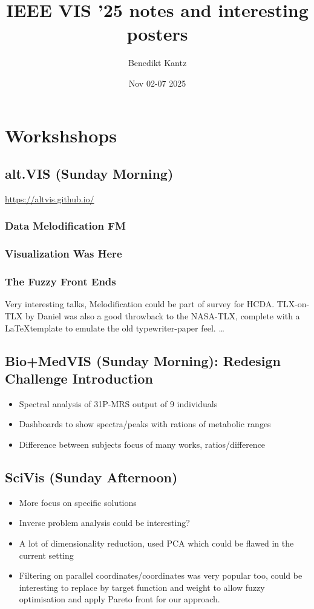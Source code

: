 \documentclass[a4paper]{article}
\title{IEEE VIS '25 notes and interesting posters}
\author{Benedikt Kantz}
\date{Nov 02-07 2025}
\begin{document}
\maketitle
\tableofcontents
\section{Workshshops}
\subsection{alt.VIS (Sunday Morning)}
\url{https://altvis.github.io/}
\subsubsection{Data Melodification FM}
\subsubsection{Visualization Was Here}
\subsubsection{The Fuzzy Front Ends}

Very interesting talks, Melodification could be part of survey for HCDA. TLX-on-TLX by Daniel was also a good throwback to the NASA-TLX, complete with a \LaTeX template to emulate the old typewriter-paper feel.
\ldots
\subsection{Bio+MedVIS (Sunday Morning): Redesign Challenge Introduction}
\begin{itemize}
    \item Spectral analysis of 31P-MRS output of 9 individuals
    \item Dashboards to show spectra/peaks with rations of metabolic ranges
    \item Difference between subjects focus of many works, ratios/difference
\end{itemize}
\subsection{SciVis (Sunday Afternoon)}
\begin{itemize}
    \item More focus on specific solutions
    \item Inverse problem analysis could be interesting?
    \item A lot of dimensionality reduction, used PCA which could be flawed in the current setting
    \item Filtering on parallel coordinates/coordinates was very popular too, could be interesting to replace by target function and weight to allow fuzzy optimisation and apply Pareto front for our approach.
\end{itemize}
\end{document}
